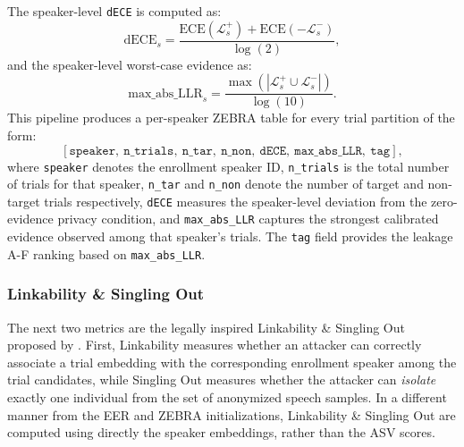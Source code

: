 \documentclass[12pt,leqno,a4paper]{article}
\begin{document}
The speaker-level \texttt{dECE} is computed as:
\begin{equation}
\mathrm{dECE}_{s}
=
\frac{
\mathrm{ECE}(\mathcal{L}^{+}_{s})
+
\mathrm{ECE}(-\mathcal{L}^{-}_{s})
}{
\log(2)
},
\end{equation}
and the speaker-level worst-case evidence as:
\begin{equation}
\mathrm{max\_abs\_LLR}_{s}
=
\frac{
\max \left(
\left|
\mathcal{L}^{+}_{s} \cup \mathcal{L}^{-}_{s}
\right|
\right)
}{
\log(10)
}.
\end{equation}
This pipeline produces a per-speaker ZEBRA table for every trial partition of the form:
\begin{equation}
\left[
\texttt{speaker},\ 
\texttt{n\_trials},\ 
\texttt{n\_tar},\ 
\texttt{n\_non},\ 
\texttt{dECE},\ 
\texttt{max\_abs\_LLR},\ 
\texttt{tag}
\right],
\end{equation}
where \texttt{speaker} denotes the enrollment speaker ID, \texttt{n\_trials} is the total number of trials for that speaker, \texttt{n\_tar} and \texttt{n\_non} denote the number of target and non-target trials respectively, \texttt{dECE} measures the speaker-level deviation from the zero-evidence privacy condition, and \texttt{max\_abs\_LLR} captures the strongest calibrated evidence observed among that speaker's trials. 
The \texttt{tag} field provides the leakage A-F ranking based on \texttt{max\_abs\_LLR}.


\subsubsection{Linkability \& Singling Out}
\label{subseubsec:linkabilitysinglingout}
The next two metrics are the legally inspired 
Linkability \& Singling Out proposed by 
\cite{vauquier25_interspeech}. First, Linkability measures whether an attacker can correctly associate a trial embedding 
with the corresponding enrollment speaker among the trial candidates, 
while Singling Out measures whether the attacker can \textit{isolate} 
exactly one individual from the set of anonymized speech samples. In a different manner from the EER and ZEBRA initializations, Linkability \& Singling Out are computed using directly the speaker embeddings, rather than the ASV scores.
\end{document}
